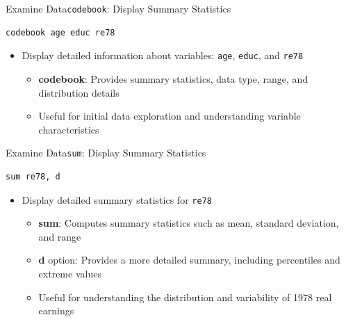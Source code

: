 \documentclass[dvipsnames,hyperref={pdfpagelabels=false}]{beamer}
\begin{document}
\begin{frame}[fragile]{Examine Data}{\texttt{codebook}: Display Summary Statistics}
\begin{lstlisting}
codebook age educ re78
\end{lstlisting}
\begin{itemize}
	\vspace{0.2cm}
	\item Display detailed information about variables: \texttt{age}, \texttt{educ}, and \texttt{re78}
	\vspace{0.2cm}
	\begin{itemize}
		\item \textbf{codebook}: Provides summary statistics, data type, range, and distribution details
		\vspace{0.2cm}
		\item Useful for initial data exploration and understanding variable characteristics
	\end{itemize}
\end{itemize}
\end{frame}


\begin{frame}[fragile]{Examine Data}{\texttt{sum}: Display Summary Statistics}
\begin{lstlisting}
sum re78, d
\end{lstlisting}
\begin{itemize}
	\vspace{0.2cm}
	\item Display detailed summary statistics for \texttt{re78}
	\vspace{0.2cm}
	\begin{itemize}
		\item \textbf{sum}: Computes summary statistics such as mean, standard deviation, and range
		\vspace{0.2cm}
		\item \textbf{d} option: Provides a more detailed summary, including percentiles and extreme values
		\vspace{0.2cm}
		\item Useful for understanding the distribution and variability of 1978 real earnings
	\end{itemize}
\end{itemize}
\end{frame}
\end{document}
